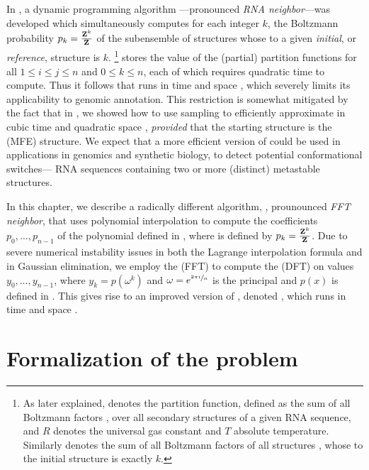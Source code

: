 In \citep{freyhult.b07}, a dynamic programming algorithm
\rnabor---pronounced {\em RNA neighbor}---was developed which simultaneously
computes for
each integer $k$, the Boltzmann probability $p_k = \frac{{\bf Z}^{k}_{}}{{\bf Z}^{}_{}}$
of the subensemble of structures
whose \bpd to a given {\em initial}, or
{\em reference}, structure \strSt is $k$.
\footnote{As later
explained, \fullZ denotes the partition function, defined as the sum of
all Boltzmann factors \boltzf{\str}, over all secondary structures \str
of a given RNA sequence, and $R$ denotes the universal
gas constant and $T$ absolute temperature. Similarly  denotes the
sum of all Boltzmann factors of all structures \str, whose \bpd
to the initial structure \strSt is exactly $k$.}
\rnabor stores the value of the (partial)
partition functions  for all $1 \leq i \leq j \leq n$ and
$0 \leq k \leq n$, each of which requires quadratic time to compute.
Thus it follows that \rnabor runs in time  and space
, which severely limits its applicability to genomic annotation.
This restriction is somewhat mitigated by the fact that
in \citep{cloteloulorenz}, we showed how to use sampling
\citep{ding.nar03} to efficiently approximate
\rnabor in cubic time  and quadratic space ,
{\em provided} that the starting structure \strSt is the \mfe
(MFE) structure. We expect that a more efficient version of
\rnabor could be used in applications in genomics and synthetic
biology, to detect potential conformational switches---
RNA sequences containing two or more (distinct) metastable structures.

In this chapter, we describe a radically different algorithm, \fftbor
\citep{senter.po12},
prounounced {\em FFT neighbor},
that uses polynomial interpolation to compute the
coefficients $p_0,\ldots,p_{n-1}$ of the polynomial defined in
,
where \pk is defined by $p_k = \frac{{\bf Z}^{k}_{}}{{\bf Z}^{}_{}}$.
Due to severe numerical instability issues in both the Lagrange
interpolation formula and in Gaussian elimination, we employ
the \fft (FFT) to compute the \idft (DFT) on values $y_0,\ldots,y_{n-1}$,
where $y_k = p(\omega^k)$ and
$\omega = e^{\sfrac{2 \pi i}{n}}$ is the principal \nRoU and
$p(x)$ is defined in . This
gives rise to an improved version of \rnabor, denoted \fftbor,
which runs in time  and space .

\section{Formalization of the problem}
\label{sec:fftbor:formal}

